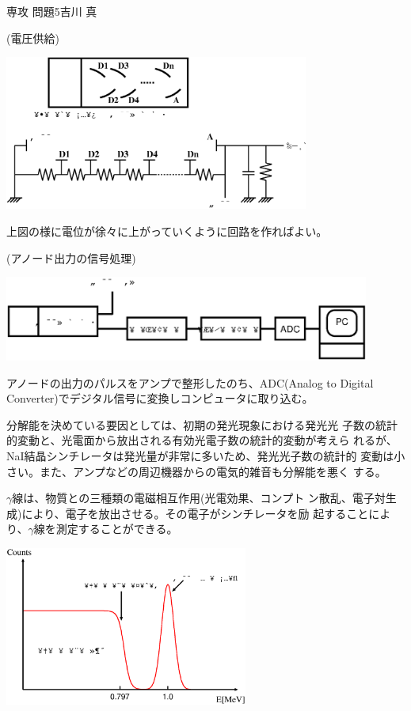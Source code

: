 \documentclass[fleqn]{jbook}
\begin{document}
\begin{answer}{専攻 問題5}{吉川 真}
 \begin{subanswers}
  \SubAnswer
  (電圧供給)
  \begin{center}
   \includegraphics[width=10cm,clip]{1999phy5-2.eps}
  \end{center}
  上図の様に電位が徐々に上がっていくように回路を作ればよい。

  (アノード出力の信号処理)
  \begin{center}
    \includegraphics[width=12cm,clip]{1999phy5-3.eps}
  \end{center}
  アノードの出力のパルスをアンプで整形したのち、ADC(Analog to Digital
  Converter)でデジタル信号に変換しコンピュータに取り込む。

  \SubAnswer 分解能を決めている要因としては、初期の発光現象における発光光
  子数の統計的変動と、光電面から放出される有効光電子数の統計的変動が考えら
  れるが、NaI結晶シンチレータは発光量が非常に多いため、発光光子数の統計的
  変動は小さい。また、アンプなどの周辺機器からの電気的雑音も分解能を悪く
  する。

  \SubAnswer $\gamma$線は、物質との三種類の電磁相互作用(光電効果、コンプト
  ン散乱、電子対生成)により、電子を放出させる。その電子がシンチレータを励
  起することにより、$\gamma$線を測定することができる。
  \begin{center}
   \includegraphics[width=8cm,clip]{1999phy5-4.eps}
  \end{center}


\end{subanswers}
\end{answer}
\end{document}
